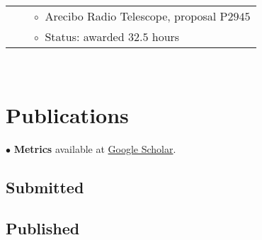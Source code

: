 \documentclass[11pt,letterpaper,sans,unicode]{moderncv}
\begin{document}
\begin{tabular}{rcl}
&\hspace{0.4cm} &{\color{color1} $\circ\;\;$}Arecibo Radio Telescope, proposal P$2945$ \\
&\hspace{0.4cm} &{\color{color1} $\circ\;\;$}Status: awarded $32.5$ hours
\end{tabular} \\


\section{Publications}



$\bullet$ \textbf{Metrics} available at {\color{color1} \href{https://scholar.google.com/citations?user=CbNY_MYAAAAJ&hl=en}{Google Scholar}}.

\subsection{Submitted}

\begin{etaremune}[leftmargin=8mm]

\end{etaremune}

\subsection{Published}

\begin{etaremune}[leftmargin=8mm]

\end{etaremune}
\end{document}
